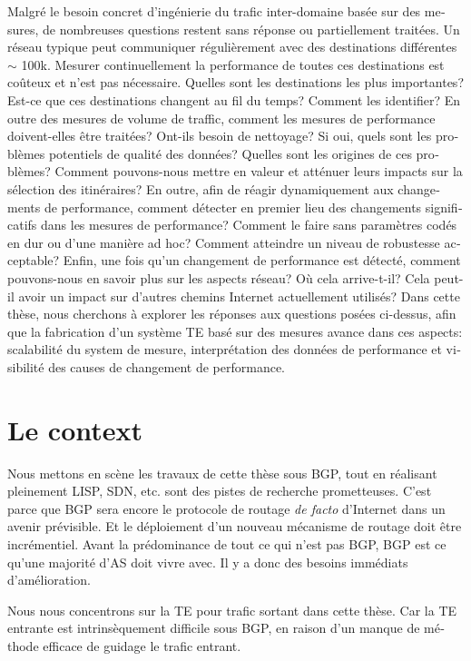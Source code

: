 \begin{otherlanguage}{french}
Malgré le besoin concret d'ingénierie du trafic inter-domaine basée sur des mesures, de nombreuses questions restent sans réponse ou partiellement traitées.
Un réseau typique peut communiquer régulièrement avec des destinations différentes $\sim$ 100k.
Mesurer continuellement la performance de toutes ces destinations est coûteux et n'est pas nécessaire.
Quelles sont les destinations les plus importantes? Est-ce que ces destinations changent au fil du temps? Comment les identifier?
En outre des mesures de volume de traffic, comment les mesures de performance doivent-elles être traitées? Ont-ils besoin de nettoyage?
Si oui, quels sont les problèmes potentiels de qualité des données? Quelles sont les origines de ces problèmes? 
Comment pouvons-nous mettre en valeur et atténuer leurs impacts sur la sélection des itinéraires?
En outre, afin de réagir dynamiquement aux changements de performance, 
comment détecter en premier lieu des changements significatifs dans les mesures de performance? 
Comment le faire sans paramètres codés en dur ou d'une manière ad hoc? Comment atteindre un niveau de robustesse acceptable?
Enfin, une fois qu'un changement de performance est détecté, comment pouvons-nous en savoir plus sur les aspects réseau? 
Où cela arrive-t-il? Cela peut-il avoir un impact sur d'autres chemins Internet actuellement utilisés?
Dans cette thèse, nous cherchons à explorer les réponses aux questions posées ci-dessus, 
afin que la fabrication d'un système TE basé sur des mesures avance dans ces aspects: 
scalabilité du system de mesure, interprétation des données de performance et visibilité des causes de changement de performance.

\section*{Le context}
Nous mettons en scène les travaux de cette thèse sous BGP, tout en réalisant pleinement \ac{LISP}, \ac{SDN}, etc. sont des pistes de recherche prometteuses.
C'est parce que BGP sera encore le protocole de routage \textit {de facto} d'Internet dans un avenir prévisible.
Et le déploiement d'un nouveau mécanisme de routage doit être incrémentiel.
Avant la prédominance de tout ce qui n'est pas BGP, BGP est ce qu'une majorité d'\acf{AS} doit vivre avec.
Il y a donc des besoins immédiats d'amélioration.

Nous nous concentrons sur la TE pour trafic sortant dans cette thèse.
Car la TE entrante est intrinsèquement difficile sous BGP, en raison d'un manque de méthode efficace de guidage le trafic entrant.


\end{otherlanguage}
